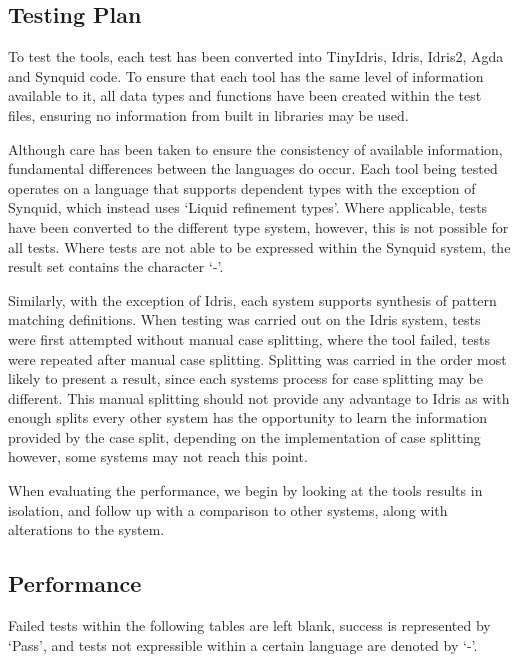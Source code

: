 \documentclass[a4paper]{article}
\begin{document}
\subsection{Testing Plan}

To test the tools, each test has been converted into TinyIdris,
Idris, Idris2, Agda and Synquid code. To ensure that each tool has the same level
of information available to it, all data types and functions have been created
within the test files, ensuring no information from built in libraries may be used.

Although care has been taken to ensure the consistency of available information,
fundamental differences between the languages do occur. Each tool being tested
operates on a language that supports dependent types with the exception of Synquid, which
instead uses `Liquid refinement types'. Where applicable, tests have been converted to the
different type system, however, this is not possible for all tests. Where tests are not
able to be expressed within the Synquid system, the result set contains the character `-'.

Similarly, with the exception of Idris, each system supports synthesis of
pattern matching definitions. When testing was carried out on the Idris
system, tests were first attempted without manual case splitting,
where the tool failed, tests were repeated after manual
case splitting. Splitting was carried in the order most likely to
present a result, since each systems process for case splitting may be different.
This manual splitting should not provide any advantage to Idris as with enough
splits every other system has the opportunity to learn the information provided by
the case split, depending on the implementation of case splitting however, some
systems may not reach this point.

When evaluating the performance, we begin by looking at the tools results in isolation,
and follow up with a comparison to other systems, along with alterations
to the system.

\subsection{Performance}
\label{sec:org9ac3710}

Failed tests within the following tables are left blank,
success is represented by `Pass', and tests not expressible within a
certain language are denoted by `-'.
 
\end{document}
